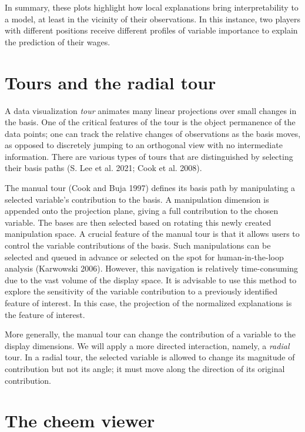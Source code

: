 \documentclass[
]{article}
\begin{document}
In summary, these plots highlight how local explanations bring
interpretability to a model, at least in the vicinity of their
observations. In this instance, two players with different positions
receive different profiles of variable importance to explain the
prediction of their wages.

\hypertarget{tours-and-the-radial-tour}{%
\section{Tours and the radial tour}\label{tours-and-the-radial-tour}}

A data visualization \emph{tour} animates many linear projections over
small changes in the basis. One of the critical features of the tour is
the object permanence of the data points; one can track the relative
changes of observations as the basis moves, as opposed to discretely
jumping to an orthogonal view with no intermediate information. There
are various types of tours that are distinguished by selecting their
basis paths (S. Lee et al. 2021; Cook et al. 2008).

The manual tour (Cook and Buja 1997) defines its basis path by
manipulating a selected variable's contribution to the basis. A
manipulation dimension is appended onto the projection plane, giving a
full contribution to the chosen variable. The bases are then selected
based on rotating this newly created manipulation space. A crucial
feature of the manual tour is that it allows users to control the
variable contributions of the basis. Such manipulations can be selected
and queued in advance or selected on the spot for human-in-the-loop
analysis (Karwowski 2006). However, this navigation is relatively
time-consuming due to the vast volume of the display space. It is
advisable to use this method to explore the sensitivity of the variable
contribution to a previously identified feature of interest. In this
case, the projection of the normalized explanations is the feature of
interest.

More generally, the manual tour can change the contribution of a
variable to the display dimensions. We will apply a more directed
interaction, namely, a \emph{radial} tour. In a radial tour, the
selected variable is allowed to change its magnitude of contribution but
not its angle; it must move along the direction of its original
contribution.

\hypertarget{sec:applicationdesign}{%
\section{The cheem viewer}\label{sec:applicationdesign}}
\end{document}
